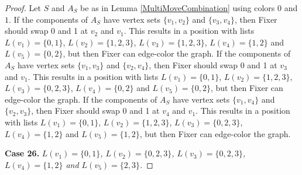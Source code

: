 \documentclass[12pt]{amsart}
\theoremstyle{plain}
\theoremstyle{definition}
\theoremstyle{remark}
\begin{document}
\begin{proof}
Let $S$ and $A_S$ be as in Lemma \ref{MultiMoveCombination} using colors $0$ and $1$. If the components of $A_S$ have vertex sets $\{v_1, v_2\}$ and $\{v_3, v_4\}$, then Fixer should swap 0 and 1 at $v_2$ and $v_1$. This results in a position with lists $L(v_1) = \{0, 1\}$, $L(v_2) = \{1, 2, 3\}$, $L(v_3) = \{1, 2, 3\}$, $L(v_4) = \{1, 2\}$ and $L(v_5) = \{0, 2\}$, but then Fixer can edge-color the graph.
If the components of $A_S$ have vertex sets $\{v_1, v_3\}$ and $\{v_2, v_4\}$, then Fixer should swap 0 and 1 at $v_3$ and $v_1$. This results in a position with lists $L(v_1) = \{0, 1\}$, $L(v_2) = \{1, 2, 3\}$, $L(v_3) = \{0, 2, 3\}$, $L(v_4) = \{0, 2\}$ and $L(v_5) = \{0, 2\}$, but then Fixer can edge-color the graph.
If the components of $A_S$ have vertex sets $\{v_1, v_4\}$ and $\{v_2, v_3\}$, then Fixer should swap 0 and 1 at $v_4$ and $v_1$. This results in a position with lists $L(v_1) = \{0, 1\}$, $L(v_2) = \{1, 2, 3\}$, $L(v_3) = \{0, 2, 3\}$, $L(v_4) = \{1, 2\}$ and $L(v_5) = \{1, 2\}$, but then Fixer can edge-color the graph.

\noindent\textbf{Case 26.  }\textit{$L(v_1) = \{0, 1\}$, $L(v_2) = \{0, 2, 3\}$, $L(v_3) = \{0, 2, 3\}$, $L(v_4) = \{1, 2\}$ and $L(v_5) = \{2, 3\}$.}


\end{proof}
\end{document}
